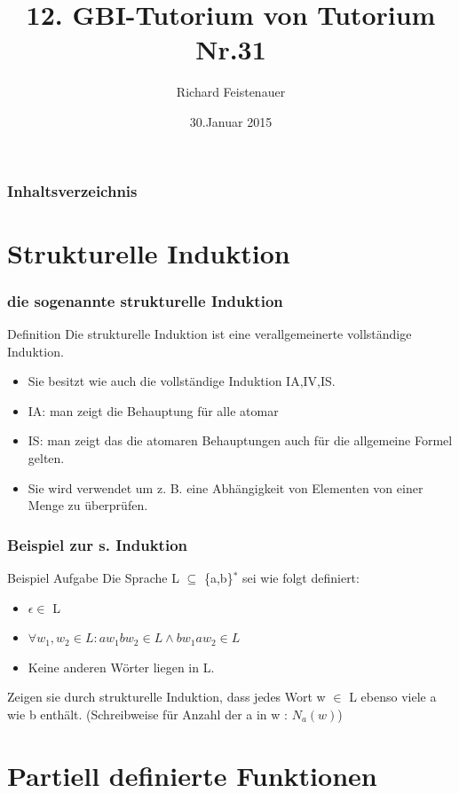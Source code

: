 \documentclass{beamer}
\author{Richard Feistenauer}
\title{12. GBI-Tutorium von Tutorium Nr.31}
\date{30.Januar 2015}
\begin{document}
\begin {frame}
	\titlepage
\end {frame}

\begin {frame}
	\frametitle {Inhaltsverzeichnis}
	\tableofcontents
\end {frame}

\section{Strukturelle Induktion}

\begin{frame}
	\frametitle{die sogenannte strukturelle Induktion}
	\begin{block}{Definition}
		Die strukturelle Induktion ist eine verallgemeinerte vollständige Induktion.
		\begin{itemize}
			\item Sie besitzt wie auch die vollständige Induktion IA,IV,IS.
			\item IA: man zeigt die Behauptung für alle atomar
			\item IS: man zeigt das die atomaren Behauptungen auch für die allgemeine Formel gelten.
			\item Sie wird verwendet um z. B. eine Abhängigkeit von Elementen von einer Menge zu überprüfen.
		\end{itemize}
	\end{block}
\end{frame}

\begin{frame}
	\frametitle{Beispiel zur s. Induktion}
	\begin{block}{Beispiel Aufgabe}
		Die Sprache L $\subseteq$ \{a,b\}$^\ast$ sei wie folgt definiert:
		\begin{itemize}
			\item $\epsilon \in$ L 
			\item $\forall w_1, w_2 \in L: aw_1bw_2 \in L \wedge bw_1aw_2 \in L$
			\item Keine anderen Wörter liegen in L.
		\end{itemize}
		Zeigen sie durch strukturelle Induktion, dass jedes Wort w $\in$ L ebenso viele a wie b enthält. (Schreibweise für Anzahl der a in w : $N_a(w)$)
	\end{block}
\end{frame}

\section{Partiell definierte Funktionen}
\end{document}
